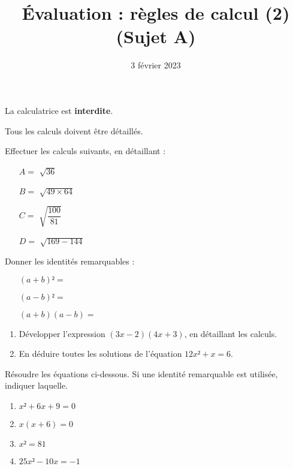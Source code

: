 \documentclass[
	classe=$2^{de}$,
	landscape,
	twocolumn
]{évaluation}
\date{3 février 2023}
\begin{document}
\title{Évaluation : règles de calcul (2) (Sujet A)}
\maketitle

\begin{tcolorbox}
	La calculatrice est \textbf{interdite}.

	Tous les calculs doivent être détaillés.
\end{tcolorbox}

\begin{exercice}[2]
	Effectuer les calculs suivants, en détaillant :
	\begin{enumerate}
		\item[$A =$] $\sqrt{36}$
		\item[$B =$] $\sqrt{49 × 64}$
		\item[$C =$] $\sqrt{\dfrac{100}{81}}$
		\item[$D =$] $\sqrt{169 - 144}$
	\end{enumerate}
\end{exercice}

\begin{exercice}[1,5]
	Donner les identités remarquables :
	\begin{enumerate}
		\item[\circled{1}] $(a + b)² = $
		\item[\circled{2}] $(a - b)² = $
		\item[\circled{3}] $(a + b)(a - b) = $
	\end{enumerate}
\end{exercice}

\begin{exercice}[2,5]
	\begin{enumerate}
		\item Développer l'expression $(3x - 2)(4x + 3)$, en détaillant les calculs.
		\item En déduire toutes les solutions de l'équation $12x² + x = 6$.
	\end{enumerate}
\end{exercice}

\begin{exercice}[4]
	Résoudre les équations ci-dessous. Si une identité remarquable est utilisée, indiquer laquelle.
	\begin{enumerate}
		\item $x² + 6x + 9 = 0$
		\item $x(x + 6) = 0$
		\item $x² = 81$
		\item $25x² - 10x = -1$
	\end{enumerate}
\end{exercice}
\end{document}
